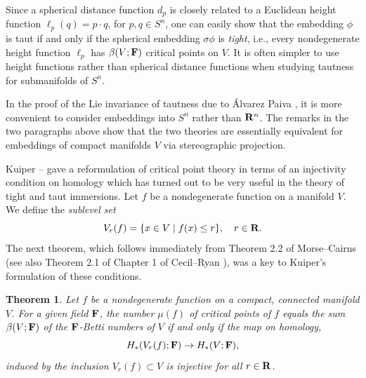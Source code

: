 \documentclass[12pt]{article}
\newtheorem{theorem}{Theorem}[section]
\begin{document}
  
Since a spherical distance function $d_p$ is closely related to a Euclidean height function
$\ell_p (q) = p \cdot q$, for $p,q \in S^n$, one can easily show that the embedding $\phi$ 
is taut if and only if the spherical embedding $\sigma \phi$ is {\em tight}, 
i.e., every nondegenerate height function $\ell_p$ has $\beta (V;{\bf F})$ critical points
on $V$. It is often simpler to use height functions rather than spherical distance functions when studying tautness
for submanifolds of $S^n$. 

In the proof of the Lie invariance of tautness due to \'{A}lvarez Paiva \cite{Alv},
it is more convenient to consider embeddings into $S^n$ rather
than ${\bf R}^n$.  The remarks in the two paragraphs above show that the two theories are essentially equivalent for
embeddings of compact manifolds $V$ via stereographic projection.

Kuiper \cite{Ku1}--\cite{Ku4} gave a reformulation of critical point theory in terms of an 
injectivity condition on homology 
which has turned out to be very useful in the theory of tight and taut immersions.
Let $f$ be a nondegenerate function on a manifold $V$.  We define the {\em sublevel set}
\begin{equation}
\label{eq:3.6.1}
V_r(f) = \{x \in V \mid f(x) \leq r\}, \quad r \in {\bf R}. 
\end{equation}
The next theorem, which follows immediately from Theorem 2.2 of Morse--Cairns \cite[p. 260]{MC} 
(see also Theorem 2.1 of Chapter 1 of Cecil--Ryan \cite{CR7}), was a key to Kuiper's formulation of these conditions.

\begin{theorem}
\label{thm:3.6.1} 
Let $f$ be a nondegenerate function on a compact, connected manifold $V$.  For a given field ${\bf F}$, the number
$\mu (f)$ of critical points of $f$ equals the sum $\beta (V;{\bf F})$ of the ${\bf F}$-Betti numbers of $V$ if and
only if the map on homology,
\begin{equation}
\label{eq:3.6.2}
H_*(V_r(f);{\bf F}) \rightarrow H_*(V;{\bf F}),
\end{equation}
induced by the inclusion $V_r(f) \subset V$ is injective for all $r \in {\bf R}$.
\end{theorem}
\end{document}
